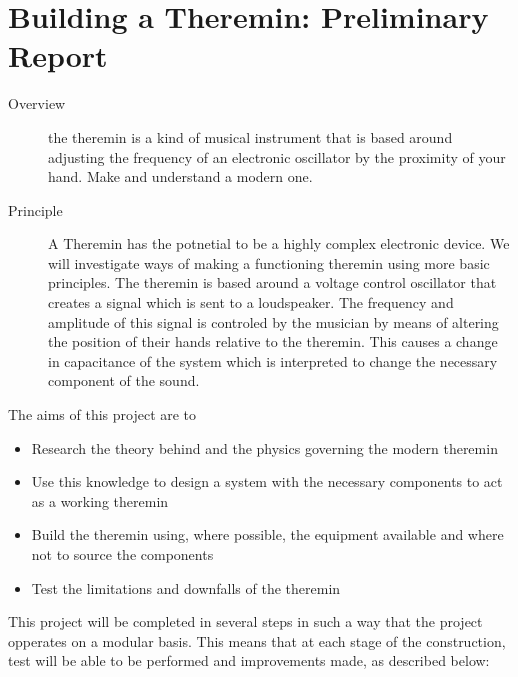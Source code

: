 \documentclass[english]{article}
\begin{document}
\vspace*{-3cm}
\part*{Building a Theremin: Preliminary Report}

\begin{description}
\item [{Overview}] the theremin is a kind of musical instrument that is based
around adjusting the frequency of an electronic oscillator by the
proximity of your hand. Make and understand a modern one.

\item [{Principle}] A Theremin has the potnetial to be a highly complex electronic device. We will investigate ways of making a functioning theremin using more basic principles. The theremin is based around a voltage control oscillator that creates a signal which is sent to a loudspeaker. The frequency and amplitude of this signal is controled by the musician by means of altering the position of their hands relative to the theremin. This causes a change in capacitance of the system which is interpreted to change the necessary component of the sound.

\end{description}

The aims of this project are to
\begin{itemize}
\item Research the theory behind and the physics governing the modern theremin
\item Use this knowledge to design a system with the necessary components
to act as a working theremin
\item Build the theremin using, where possible, the equipment available
and where not to source the components
\item Test the limitations and downfalls of the theremin
\end{itemize}
This project will be completed in several steps in such a way that the project opperates on a modular basis. This means that at each stage of the construction, test will be able to be performed and improvements made, as described below:
\end{document}
